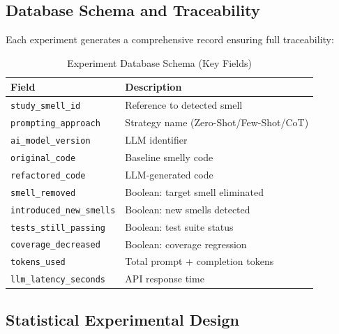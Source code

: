\documentclass[12pt]{article}
\begin{document}
\subsection{Database Schema and Traceability}

Each experiment generates a comprehensive record ensuring full traceability:

\begin{table}[h]
\centering
\caption{Experiment Database Schema (Key Fields)}
\label{tab:schema}
\begin{tabular}{@{}ll@{}}
\toprule
\textbf{Field} & \textbf{Description} \\ \midrule
\texttt{study\_smell\_id} & Reference to detected smell \\
\texttt{prompting\_approach} & Strategy name (Zero-Shot/Few-Shot/CoT) \\
\texttt{ai\_model\_version} & LLM identifier \\
\texttt{original\_code} & Baseline smelly code \\
\texttt{refactored\_code} & LLM-generated code \\
\texttt{smell\_removed} & Boolean: target smell eliminated \\
\texttt{introduced\_new\_smells} & Boolean: new smells detected \\
\texttt{tests\_still\_passing} & Boolean: test suite status \\
\texttt{coverage\_decreased} & Boolean: coverage regression \\
\texttt{tokens\_used} & Total prompt + completion tokens \\
\texttt{llm\_latency\_seconds} & API response time \\ \bottomrule
\end{tabular}
\end{table}

\subsection{Statistical Experimental Design}
\end{document}
